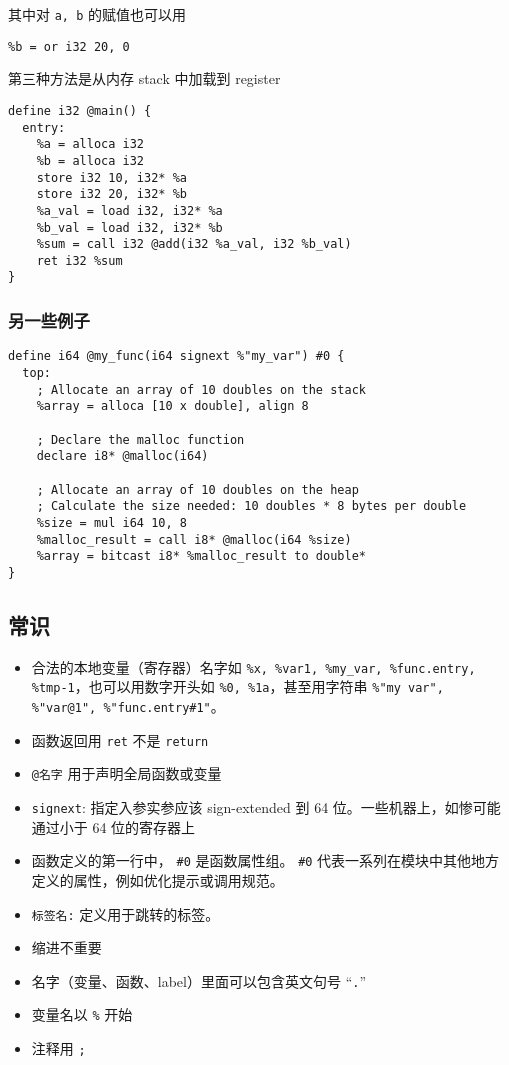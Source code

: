 其中对 \verb`a, b` 的赋值也可以用
\begin{lstlisting}[language=none]
%a = or i32 10, 0
%b = or i32 20, 0
\end{lstlisting}

第三种方法是从内存 stack 中加载到 register
\begin{lstlisting}[language=none]
define i32 @main() {
  entry:
    %a = alloca i32
    %b = alloca i32
    store i32 10, i32* %a
    store i32 20, i32* %b
    %a_val = load i32, i32* %a
    %b_val = load i32, i32* %b
    %sum = call i32 @add(i32 %a_val, i32 %b_val)
    ret i32 %sum
}
\end{lstlisting}

\subsubsection{另一些例子}
\begin{lstlisting}[language=none]
define i64 @my_func(i64 signext %"my_var") #0 {
  top:
    ; Allocate an array of 10 doubles on the stack
    %array = alloca [10 x double], align 8

    ; Declare the malloc function
    declare i8* @malloc(i64)

    ; Allocate an array of 10 doubles on the heap
    ; Calculate the size needed: 10 doubles * 8 bytes per double
    %size = mul i64 10, 8
    %malloc_result = call i8* @malloc(i64 %size)
    %array = bitcast i8* %malloc_result to double*
}
\end{lstlisting}

\subsection{常识}
\begin{itemize}
\item 合法的本地变量（寄存器）名字如 \verb`%x, %var1, %my_var, %func.entry, %tmp-1`，也可以用数字开头如 \verb`%0, %1a`，甚至用字符串 \verb`%"my var", %"var@1", %"func.entry#1"`。
\item 函数返回用 \verb`ret` 不是 \verb`return`
\item \verb`@名字` 用于声明全局函数或变量
\item \verb`signext`: 指定入参实参应该 sign-extended 到 64 位。一些机器上，如惨可能通过小于 64 位的寄存器上
\item 函数定义的第一行中， \verb`#0` 是函数属性组。 \verb`#0` 代表一系列在模块中其他地方定义的属性，例如优化提示或调用规范。
\item \verb`标签名:` 定义用于跳转的标签。
\item 缩进不重要
\item 名字（变量、函数、label）里面可以包含英文句号 “\verb`.`”
\item 变量名以 \verb`%` 开始
\item 注释用 \verb`;`
\end{itemize}

